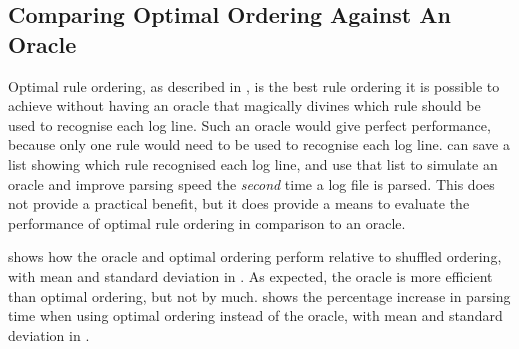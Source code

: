 



\FloatBarrier{}

\subsection{Comparing Optimal Ordering Against An Oracle}

\label{perfect rule ordering}

Optimal rule ordering, as described in , is the best rule ordering it is possible to achieve without
having an oracle that magically divines which rule should be used to
recognise each log line.  Such an oracle would give perfect performance,
because only one rule would need to be used to recognise each log line.
\parsername{} can save a list showing which rule recognised each log line,
and use that list to simulate an oracle and improve parsing speed the
\textit{second\/} time a log file is parsed.  This does not provide a
practical benefit, but it does provide a means to evaluate the performance
of optimal rule ordering in comparison to an oracle.

 shows how the oracle and optimal ordering perform relative
to shuffled ordering, with mean and standard deviation in .
As expected, the oracle is more efficient than optimal ordering, but not by
much.   shows the percentage increase in parsing
time when using optimal ordering instead of the oracle, with mean and
standard deviation in .

